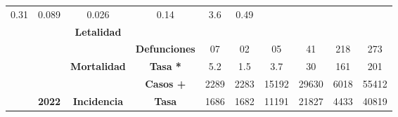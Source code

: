 \begin{tabular}{lccc|cccccc|}
		\multicolumn{1}{c|}{\cellcolor[HTML]{FAF0D7}0.31} &
		\multicolumn{1}{c|}{\cellcolor[HTML]{FAF0D7}0.089} &
		\multicolumn{1}{c|}{\cellcolor[HTML]{FAF0D7}0.026} &
		\multicolumn{1}{c|}{\cellcolor[HTML]{FAF0D7}0.14} &
		\multicolumn{1}{c|}{\cellcolor[HTML]{FAF0D7}3.6} &
		\cellcolor[HTML]{FAF0D7}0.49 \\ \cline{4-10} 
		\multicolumn{1}{l|}{} &
		\multicolumn{1}{c|}{\cellcolor[HTML]{E2EFDA}} &
		\multicolumn{1}{c|}{\multirow{-2}{*}{\cellcolor[HTML]{E2EFDA}\textbf{Letalidad}}} &
		\cellcolor[HTML]{E2EFDA} &
		\multicolumn{1}{c|}{\cellcolor[HTML]{E2EFDA}} &
		\multicolumn{1}{c|}{\cellcolor[HTML]{E2EFDA}} &
		\multicolumn{1}{c|}{\cellcolor[HTML]{E2EFDA}} &
		\multicolumn{1}{c|}{\cellcolor[HTML]{E2EFDA}} &
		\multicolumn{1}{c|}{\cellcolor[HTML]{E2EFDA}} &
		\cellcolor[HTML]{E2EFDA} \\ \cline{3-3}
		\multicolumn{1}{l|}{} &
		\multicolumn{1}{c|}{\cellcolor[HTML]{E2EFDA}} &
		\multicolumn{1}{c|}{\cellcolor[HTML]{E2EFDA}} &
		\multirow{-2}{*}{\cellcolor[HTML]{E2EFDA}\textbf{Defunciones}} &
		\multicolumn{1}{c|}{\multirow{-2}{*}{\cellcolor[HTML]{E2EFDA}07}} &
		\multicolumn{1}{c|}{\multirow{-2}{*}{\cellcolor[HTML]{E2EFDA}02}} &
		\multicolumn{1}{c|}{\multirow{-2}{*}{\cellcolor[HTML]{E2EFDA}05}} &
		\multicolumn{1}{c|}{\multirow{-2}{*}{\cellcolor[HTML]{E2EFDA}41}} &
		\multicolumn{1}{c|}{\multirow{-2}{*}{\cellcolor[HTML]{E2EFDA}218}} &
		\multirow{-2}{*}{\cellcolor[HTML]{E2EFDA}273} \\ \cline{4-10} 
		\multicolumn{1}{l|}{} &
		\multicolumn{1}{c|}{\cellcolor[HTML]{E2EFDA}} &
		\multicolumn{1}{c|}{\multirow{-2}{*}{\cellcolor[HTML]{E2EFDA}\textbf{Mortalidad}}} &
		\cellcolor[HTML]{E2EFDA}\textbf{Tasa *} &
		\multicolumn{1}{c|}{\cellcolor[HTML]{E2EFDA}5.2} &
		\multicolumn{1}{c|}{\cellcolor[HTML]{E2EFDA}1.5} &
		\multicolumn{1}{c|}{\cellcolor[HTML]{E2EFDA}3.7} &
		\multicolumn{1}{c|}{\cellcolor[HTML]{E2EFDA}30} &
		\multicolumn{1}{c|}{\cellcolor[HTML]{E2EFDA}161} &
		\cellcolor[HTML]{E2EFDA}201 \\ \cline{3-10} 
		\multicolumn{1}{l|}{} &
		\multicolumn{1}{c|}{\cellcolor[HTML]{E2EFDA}} &     
		\multicolumn{1}{c|}{\cellcolor[HTML]{E2EFDA}} &
		\cellcolor[HTML]{E2EFDA}\textbf{Casos +} &
		\multicolumn{1}{c|}{\cellcolor[HTML]{E2EFDA}2289} &
		\multicolumn{1}{c|}{\cellcolor[HTML]{E2EFDA}2283} &
		\multicolumn{1}{c|}{\cellcolor[HTML]{E2EFDA}15192} &
		\multicolumn{1}{c|}{\cellcolor[HTML]{E2EFDA}29630} &
		\multicolumn{1}{c|}{\cellcolor[HTML]{E2EFDA}6018} &
		\cellcolor[HTML]{E2EFDA}55412 \\ \cline{4-10} 
		\multicolumn{1}{l|}{} &
		\multicolumn{1}{c|}{\multirow{-6}{*}{\cellcolor[HTML]{E2EFDA}\textbf{2022}}} &
		\multicolumn{1}{c|}{\multirow{-2}{*}{\cellcolor[HTML]{E2EFDA}\textbf{Incidencia}}} &
		\cellcolor[HTML]{E2EFDA}\textbf{Tasa} &
		\multicolumn{1}{c|}{\cellcolor[HTML]{E2EFDA}1686} &
		\multicolumn{1}{c|}{\cellcolor[HTML]{E2EFDA}1682} &
		\multicolumn{1}{c|}{\cellcolor[HTML]{E2EFDA}11191} &
		\multicolumn{1}{c|}{\cellcolor[HTML]{E2EFDA}21827} &
		\multicolumn{1}{c|}{\cellcolor[HTML]{E2EFDA}4433} &
		\cellcolor[HTML]{E2EFDA}40819 \\ \cline{2-10} 	
	\end{tabular}